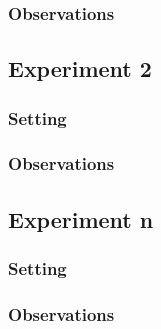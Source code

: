 \documentclass[11pt]{article}
\begin{document}
\subsubsection{Observations}

\subsection{Experiment 2}

\subsubsection{Setting}

\subsubsection{Observations}

\subsection{Experiment n}

\subsubsection{Setting}

\subsubsection{Observations}
\end{document}
